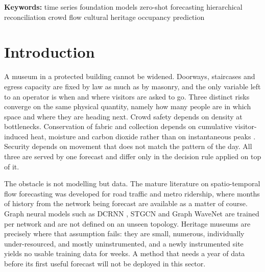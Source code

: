 \documentclass[11pt]{article}
\theoremstyle{plain}
\theoremstyle{definition}
\theoremstyle{remark}
\begin{document}
\begin{abstract}
\end{abstract}

\noindent\textbf{Keywords:} time series foundation models \textendash{} zero-shot forecasting \textendash{} hierarchical reconciliation \textendash{} crowd flow \textendash{} cultural heritage \textendash{} occupancy prediction

\section{Introduction}

A museum in a protected building cannot be widened. Doorways, staircases and egress capacity are fixed by law as much as by masonry, and the only variable left to an operator is when and where visitors are asked to go. Three distinct risks converge on the same physical quantity, namely how many people are in which space and where they are heading next. Crowd safety depends on density at bottlenecks. Conservation of fabric and collection depends on cumulative visitor-induced heat, moisture and carbon dioxide rather than on instantaneous peaks \citep{camuffo2019,en15757}. Security depends on movement that does not match the pattern of the day. All three are served by one forecast and differ only in the decision rule applied on top of it.

The obstacle is not modelling but data. The mature literature on spatio-temporal flow forecasting was developed for road traffic and metro ridership, where months of history from the network being forecast are available as a matter of course. Graph neural models such as DCRNN \citep{li2018dcrnn}, STGCN \citep{yu2018stgcn} and Graph WaveNet \citep{wu2019graphwavenet} are trained per network and are not defined on an unseen topology. Heritage museums are precisely where that assumption fails: they are small, numerous, individually under-resourced, and mostly uninstrumented, and a newly instrumented site yields no usable training data for weeks. A method that needs a year of data before its first useful forecast will not be deployed in this sector.
\end{document}
